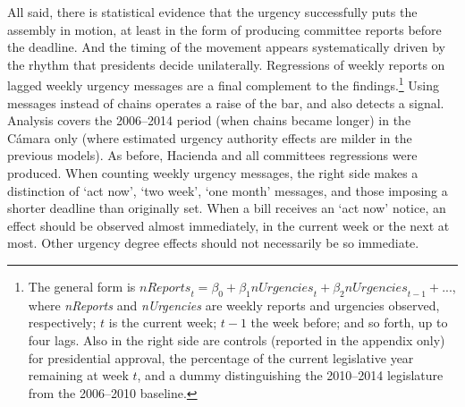 \documentclass[letter,12pt]{article}
\begin{document}
All said, there is statistical evidence that the urgency successfully puts the assembly in motion, at least in the form of producing committee reports before the deadline. And the timing of the movement appears systematically driven by the rhythm that presidents decide unilaterally. Regressions of weekly reports on lagged weekly urgency messages are a final complement to the findings.\footnote{The general form is $\mathit{nReports}_t = \beta_0 + \beta_1 \mathit{nUrgencies}_t + \beta_2 \mathit{nUrgencies}_{t-1} + ...$, where \emph{nReports} and \emph{nUrgencies} are weekly reports and urgencies observed, respectively; $t$ is the current week; $t-1$ the week before; and so forth, up to four lags. Also in the right side are controls (reported in the appendix only) for presidential approval, the percentage of the current legislative year remaining at week $t$, and a dummy distinguishing the 2010--2014 legislature from the 2006--2010 baseline.} Using messages instead of chains operates a raise of the bar, and also detects a signal. Analysis covers the 2006--2014 period (when chains became longer) in the C\'amara only (where estimated urgency authority effects are milder in the previous models). As before, Hacienda and all committees regressions were produced. When counting weekly urgency messages, the right side makes a distinction of `act now', `two week', `one month' messages, and those imposing a shorter deadline than originally set. When a bill receives an `act now' notice, an effect should be observed almost immediately, in the current week or the next at most. Other urgency degree effects should not necessarily be so immediate. 
\end{document}
